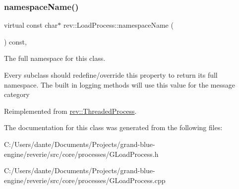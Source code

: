 \subsubsection{\texorpdfstring{namespaceName()}{namespaceName()}}
{\footnotesize\ttfamily virtual const char$\ast$ rev\+::\+Load\+Process\+::namespace\+Name (\begin{DoxyParamCaption}{ }\end{DoxyParamCaption}) const\hspace{0.3cm}{\ttfamily [inline]}, {\ttfamily [virtual]}}



The full namespace for this class. 

Every subclass should redefine/override this property to return its full namespace. The built in logging methods will use this value for the message category 

Reimplemented from \mbox{\hyperlink{classrev_1_1_threaded_process_a102e7ef754f41bb16225c4207b6b3c58}{rev\+::\+Threaded\+Process}}.



The documentation for this class was generated from the following files\+:\begin{DoxyCompactItemize}
\item 
C\+:/\+Users/dante/\+Documents/\+Projects/grand-\/blue-\/engine/reverie/src/core/processes/G\+Load\+Process.\+h\item 
C\+:/\+Users/dante/\+Documents/\+Projects/grand-\/blue-\/engine/reverie/src/core/processes/G\+Load\+Process.\+cpp\end{DoxyCompactItemize}
